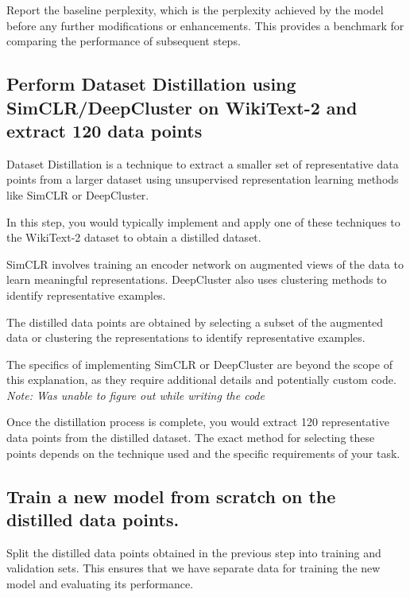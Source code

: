 \documentclass{article}
\begin{document}
\medskip

Report the baseline perplexity, which is the perplexity achieved by the model before any further modifications or enhancements. This provides a benchmark for comparing the performance of subsequent steps.

\subsection{Perform Dataset Distillation using SimCLR/DeepCluster on WikiText-2 and extract 120 data points}
\label{headings}

Dataset Distillation is a technique to extract a smaller set of representative data points from a larger dataset using unsupervised representation learning methods like SimCLR or DeepCluster.

\medskip

In this step, you would typically implement and apply one of these techniques to the WikiText-2 dataset to obtain a distilled dataset.

\medskip

SimCLR involves training an encoder network on augmented views of the data to learn meaningful representations. DeepCluster also uses clustering methods to identify representative examples.

\medskip

The distilled data points are obtained by selecting a subset of the augmented data or clustering the representations to identify representative examples.

\medskip

The specifics of implementing SimCLR or DeepCluster are beyond the scope of this explanation, as they require additional details and potentially custom code.
\textit{Note: Was unable to figure out while writing the code}

\medskip

Once the distillation process is complete, you would extract 120 representative data points from the distilled dataset. The exact method for selecting these points depends on the technique used and the specific requirements of your task.

\subsection{Train a new model from scratch on the distilled data points.}
\label{gen_inst}

Split the distilled data points obtained in the previous step into training and validation sets. This ensures that we have separate data for training the new model and evaluating its performance.
\end{document}
